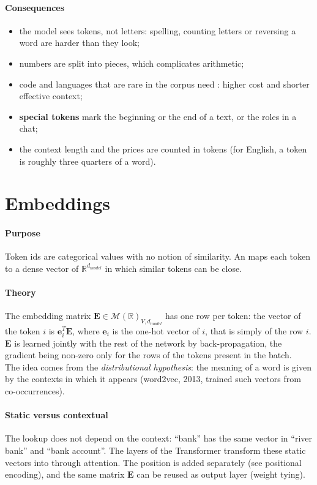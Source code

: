 \paragraph{Consequences}
\begin{itemize}
    \item the model sees tokens, not letters: spelling, counting letters or reversing a
        word are harder than they look;
    \item numbers are split into pieces, which complicates arithmetic;
    \item code and languages that are rare in the corpus need :
        higher cost and shorter effective context;
    \item \textbf{special tokens} mark the beginning or the end of a text, or the roles in a
        chat;
    \item the context length and the prices are counted in tokens (for English, a token
        is roughly three quarters of a word).
\end{itemize}

\section{Embeddings}
\paragraph{Purpose}
Token ids are categorical values with no notion of similarity. An  maps each
token to a dense vector of $\mathbb{R}^{d_{model}}$ in which similar tokens can be close.

\paragraph{Theory}
The embedding matrix $\bm{E}\in\mathcal{M}(\mathbb{R})_{V,d_{model}}$ has one row per token:
the vector of the token $i$ is $\bm{e}_{i}^{T}\bm{E}$, where $\bm{e}_{i}$ is the one-hot
vector of $i$, that is simply  of the row $i$.\\
$\bm{E}$ is learned jointly with the rest of the network by back-propagation, the gradient
being non-zero only for the rows of the tokens present in the batch.\\
The idea comes from the \emph{distributional hypothesis}: the meaning of a word is given by
the contexts in which it appears (word2vec, 2013, trained such vectors from co-occurrences).

\paragraph{Static versus contextual}
The lookup does not depend on the context: ``bank'' has the same vector in ``river bank''
and ``bank account''. The layers of the Transformer transform these static vectors into
 through attention. The position is added separately (see
positional encoding), and the same matrix $\bm{E}$ can be reused as output layer (weight
tying).
